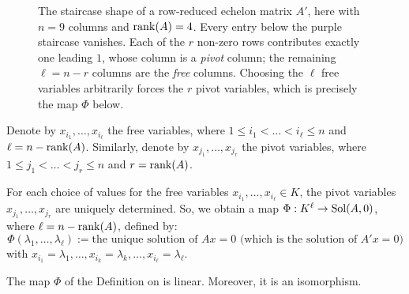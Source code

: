 \begin{figure}[htbp]
\caption{The staircase shape of a row-reduced echelon matrix $A'$, here with
$n = 9$ columns and $\operatorname{rank}(A) = 4$. Every entry below the purple staircase
vanishes. Each of the $r$ non-zero rows contributes exactly one leading $1$,
whose column is a \emph{pivot} column; the remaining $\ell = n - r$ columns are
the \emph{free} columns. Choosing the $\ell$ free variables arbitrarily forces
the $r$ pivot variables, which is precisely the map $\Phi$ below.}
\label{fig:rref_pivot_staircase}
\end{figure}

Denote by $x_{i_1}, \dots, x_{i_\ell}$ the free variables, where $1 \le i_1 < \dots < i_\ell \le n$ and $\ell = n - \operatorname{rank}(A)$. Similarly, denote by $x_{j_1}, \dots, x_{j_r}$ the pivot variables, where $1 \le j_1 < \dots < j_r \le n$ and $r = \operatorname{rank}(A)$.

\begin{definition*}
\label{def:free_variable_parametrisation}
For each choice of values for the free variables $x_{i_1}, \dots, x_{i_\ell} \in K$, the pivot variables $x_{j_1}, \dots, x_{j_r}$ are uniquely determined. So, we obtain a map $\Phi: K^\ell \to \operatorname{Sol}(A, 0)$, where $\ell = n - \operatorname{rank}(A)$, defined by:
\begin{equation*}
    \Phi(\lambda_1, \dots, \lambda_\ell) := \text{the unique solution of } Ax = 0 \text{ (which is the solution of } A'x = 0 \text{)}
\end{equation*}
with $x_{i_1} = \lambda_1, \dots, x_{i_k} = \lambda_k, \dots, x_{i_\ell} = \lambda_\ell$.
\end{definition*}

\begin{proposition}
\label{prop:solution_map_isomorphism}
The map $\Phi$ of the Definition on  is linear. Moreover, it is an isomorphism.
\end{proposition}

